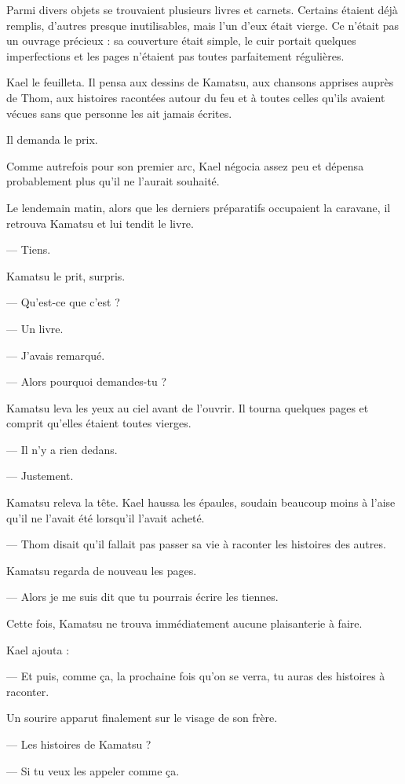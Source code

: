 Parmi divers objets se trouvaient plusieurs livres et carnets. Certains étaient
déjà remplis, d'autres presque inutilisables, mais l'un d'eux était vierge. Ce
n'était pas un ouvrage précieux : sa couverture était simple, le cuir portait
quelques imperfections et les pages n'étaient pas toutes parfaitement
régulières.

Kael le feuilleta. Il pensa aux dessins de Kamatsu, aux chansons apprises
auprès de Thom, aux histoires racontées autour du feu et à toutes celles qu'ils
avaient vécues sans que personne les ait jamais écrites.

Il demanda le prix.

Comme autrefois pour son premier arc, Kael négocia assez peu et dépensa
probablement plus qu'il ne l'aurait souhaité.

Le lendemain matin, alors que les derniers préparatifs occupaient la caravane,
il retrouva Kamatsu et lui tendit le livre.

— Tiens.

Kamatsu le prit, surpris.

— Qu'est-ce que c'est ?

— Un livre.

— J'avais remarqué.

— Alors pourquoi demandes-tu ?

Kamatsu leva les yeux au ciel avant de l'ouvrir. Il tourna quelques pages et
comprit qu'elles étaient toutes vierges.

— Il n'y a rien dedans.

— Justement.

Kamatsu releva la tête. Kael haussa les épaules, soudain beaucoup moins à
l'aise qu'il ne l'avait été lorsqu'il l'avait acheté.

— Thom disait qu'il fallait pas passer sa vie à raconter les histoires des
autres.

Kamatsu regarda de nouveau les pages.

— Alors je me suis dit que tu pourrais écrire les tiennes.

Cette fois, Kamatsu ne trouva immédiatement aucune plaisanterie à faire.

Kael ajouta :

— Et puis, comme ça, la prochaine fois qu'on se verra, tu auras des histoires à
raconter.

Un sourire apparut finalement sur le visage de son frère.

— Les histoires de Kamatsu ?

— Si tu veux les appeler comme ça.

